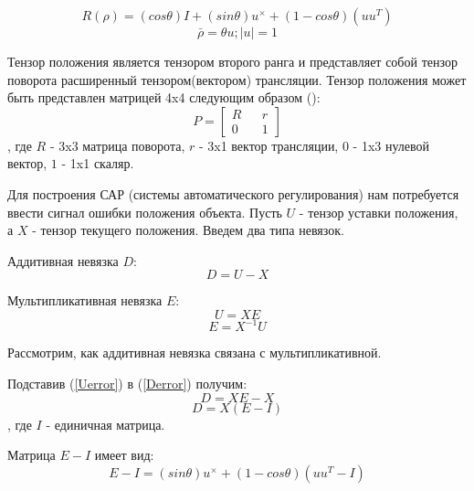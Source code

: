 \documentclass[a4paper]{article}
\begin{document}
\begin{equation}
R(\rho) = (cos \theta) I + (sin \theta)u^{\times} + (1-cos \theta)(uu^T)
\end{equation}
\begin{equation} \bar{\rho} = \theta u; |u| = 1 \end{equation}

Тензор положения является тензором второго ранга и представляет собой тензор поворота расширенный тензором(вектором) трансляции. Тензор положения может быть представлен матрицей 4x4 следующим образом (\cite{complex}):
\begin{equation}
P = \begin{bmatrix}R&&r\\0&&1\end{bmatrix}
\end{equation}
, где $R$ - 3x3 матрица поворота, $r$ - 3x1 вектор трансляции, $0$ - 1x3 нулевой вектор, $1$ - 1x1 скаляр.  

Для построения САР (системы автоматического регулирования) нам потребуется ввести сигнал ошибки положения объекта. 
Пусть $U$ - тензор уставки положения, а $X$ - тензор текущего положения.
Введем два типа невязок.

Аддитивная невязка $D$:
\begin{equation} \label{Derror}
D = U - X
\end{equation}

Мультипликативная невязка $E$:
\begin{equation} \label{Uerror} U = XE 		\end{equation}
\begin{equation} \label{Eerror} E = X^{-1}U 	\end{equation}

Рассмотрим, как аддитивная невязка связана с мультипликативной. 

Подставив (\ref{Uerror}) в (\ref{Derror}) получим:
\begin{equation} D = XE - X 	\end{equation}
\begin{equation} D = X(E - I)	\end{equation}
, где $I$ - единичная матрица.

Матрица $E - I$ имеет вид:
\begin{equation} E - I = (sin \theta)u^{\times} + (1 - cos \theta)(uu^T - I) \end{equation}
\end{document}
